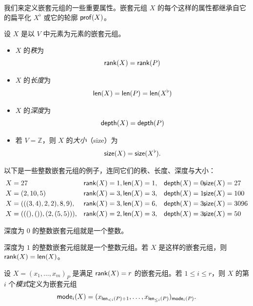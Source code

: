 我们来定义嵌套元组的一些重要属性。嵌套元组 $X$ 的每个这样的属性都继承自它的扁平化 $X^\flat$ 或它的轮廓 $\mathsf{prof}(X)$。

\begin{definition}\label{definitionofnestedtupleattributes}
    设 $X$ 是以 $V$ 中元素为元素的嵌套元组。
    \begin{itemize}
    \item $X$ 的{\it 秩}为
    \[
    \mathsf{rank}(X) = \mathsf{rank}(P)
    \]
    \item $X$ 的{\it 长度}为
    \[
    \mathsf{len}(X) = \mathsf{len}(P) = \mathsf{len}(X^\flat)
    \]
    \item $X$ 的{\it 深度}为
    \[
    \mathsf{depth}(X) = \mathsf{depth}(P)
    \]
    \item 若 $V = \mathbb{Z}$，则 $X$ 的{\it 大小}（size）为
    \[
    \mathsf{size}(X) = \mathsf{size}(X^\flat).
    \]
    \end{itemize}
\end{definition}


\begin{example}
以下是一些整数嵌套元组的例子，连同它们的秩、长度、深度与大小：
\[
\begin{aligned}
X &= 27 & \rank(X) &= 1, \len(X)  = 1, & \depth(X) &= 0, \mspace{-9mu} \size(X) = 27 \\
X &= (2,10,5) & \rank(X) &= 3, \len(X)  = 3, &\depth(X) &= 1, \mspace{-9mu} \size(X) = 100 \\
X &= (((3,4),2,2),8,9), & \rank(X) &= 3, \len(X)  = 6, & \depth(X) &= 3, \mspace{-9mu} \size(X) = 3096 \\
X &= (((),()),(2,(5,5))), & \rank(X) &= 2, \len(X)  = 3, & \depth(X) &= 3, \mspace{-9mu} \size(X) = 50 \\
\end{aligned}
\]
\end{example}

\begin{example}
    深度为 $0$ 的整数嵌套元组就是一个整数。
\end{example}

\begin{example}
深度为 $1$ 的整数嵌套元组就是一个整数元组。若 $X$ 是这样的嵌套元组，则 $\mathsf{rank}(X) = \mathsf{len}(X)$。
\end{example}

\begin{definition}\label{definitionofmodeofnestedtuple}
设 $X = (x_1,\dots,x_m)_P$ 是满足 $\mathsf{rank}(X) = r$ 的嵌套元组。若 $1 \leq i \leq r$，则 $X$ 的第 $i$ 个{\it 模式}定义为嵌套元组
\[
\mathsf{mode}_i(X) = (x_{\mathsf{len}_{<i}(P) + 1},\dots,x_{\mathsf{len}_{\leq i}(P)})_{\mathsf{mode}_i(P)}.
\]
\end{definition}

